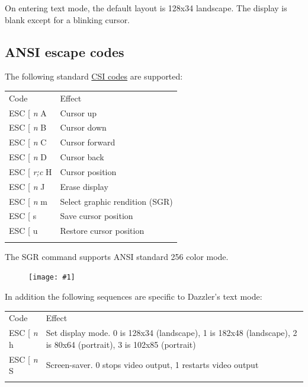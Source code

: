 \documentclass{article}
\newcommand{\heavyline}{\specialrule{1pt}{1pt}{1pt}}
\newcommand{\pngw}[2]{
\begin{figure}[H]
\begin{center}
\texttt{[image: \#1]}
\end{center}
\end{figure}
}
\newcommand{\gap}{\vspace{10pt}}
\begin{document}
On entering text mode, the default layout is 128x34 landscape. The display is blank except for a blinking cursor.

\subsection{ANSI escape codes}

The following standard
\href{https://en.wikipedia.org/wiki/ANSI_escape_code\#CSI_sequences}{CSI codes}
are supported:

\gap\noindent
\begin{tabularx}{\linewidth}{lX}
\heavyline
Code & Effect \\ \heavyline

ESC {[} \emph{n} A & Cursor up \\

ESC {[} \emph{n} B & Cursor down \\

ESC {[} \emph{n} C & Cursor forward \\

ESC {[} \emph{n} D & Cursor back \\

ESC {[} \emph{r;c} H & Cursor position \\

ESC {[} \emph{n} J & Erase display \\

ESC {[} \emph{n} m & Select graphic rendition (SGR)\\

ESC {[} s & Save cursor position \\

ESC {[} u & Restore cursor position \\ \heavyline
\end{tabularx}
\gap

The SGR command supports ANSI standard 256 color mode.

\pngw{img/gameduino-3x-dazzler/textmode256}{1.0}

In addition the following sequences are specific to Dazzler's text mode:

\gap
\noindent
\begin{tabularx}{\linewidth}{lX}
\heavyline
Code & Effect \\ \heavyline

ESC {[} \emph{n} h & 
Set display mode.  0 is 128x34 (landscape), 1 is 182x48 (landscape), 2 is 80x64 (portrait), 3 is 102x85 (portrait)
\\

ESC {[} \emph{n} S & Screen-saver.  0 stops video output, 1 restarts video output
\\ \heavyline
\end{tabularx}
\gap
\end{document}
